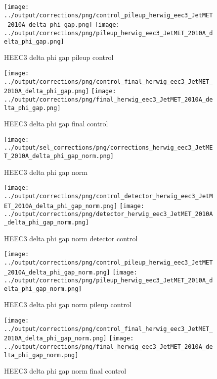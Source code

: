 \documentclass[11pt]{book}
\begin{document}
\begin{figure}[ht]
\centering
\texttt{[image: ../output/corrections/png/control\_pileup\_herwig\_eec3\_JetMET\_2010A\_delta\_phi\_gap.png]}
\texttt{[image: ../output/corrections/png/pileup\_herwig\_eec3\_JetMET\_2010A\_delta\_phi\_gap.png]}
\caption{HEEC3 delta phi gap pileup control}
\label{fig:HEEC3_JetMET_2010A_delta_phi_gap_pileup_control}
\end{figure}


\begin{figure}[ht]
\centering
\texttt{[image: ../output/corrections/png/control\_final\_herwig\_eec3\_JetMET\_2010A\_delta\_phi\_gap.png]}
\texttt{[image: ../output/corrections/png/final\_herwig\_eec3\_JetMET\_2010A\_delta\_phi\_gap.png]}
\caption{HEEC3 delta phi gap final control}
\label{fig:HEEC3_JetMET_2010A_delta_phi_gap_final_control}
\end{figure}


\begin{figure}[ht]
\centering
\texttt{[image: ../output/sel\_corrections/png/corrections\_herwig\_eec3\_JetMET\_2010A\_delta\_phi\_gap\_norm.png]}
\caption{HEEC3 delta phi gap norm}
\label{fig:HEEC3_JetMET_2010A_delta_phi_gap_norm}
\end{figure}

\begin{figure}[ht]
\centering
\texttt{[image: ../output/corrections/png/control\_detector\_herwig\_eec3\_JetMET\_2010A\_delta\_phi\_gap\_norm.png]}
\texttt{[image: ../output/corrections/png/detector\_herwig\_eec3\_JetMET\_2010A\_delta\_phi\_gap\_norm.png]}
\caption{HEEC3 delta phi gap norm detector control}
\label{fig:HEEC3_JetMET_2010A_delta_phi_gap_norm_detector_control}
\end{figure}

\begin{figure}[ht]
\centering
\texttt{[image: ../output/corrections/png/control\_pileup\_herwig\_eec3\_JetMET\_2010A\_delta\_phi\_gap\_norm.png]}
\texttt{[image: ../output/corrections/png/pileup\_herwig\_eec3\_JetMET\_2010A\_delta\_phi\_gap\_norm.png]}
\caption{HEEC3 delta phi gap norm pileup control}
\label{fig:HEEC3_JetMET_2010A_delta_phi_gap_norm_pileup_control}
\end{figure}


\begin{figure}[ht]
\centering
\texttt{[image: ../output/corrections/png/control\_final\_herwig\_eec3\_JetMET\_2010A\_delta\_phi\_gap\_norm.png]}
\texttt{[image: ../output/corrections/png/final\_herwig\_eec3\_JetMET\_2010A\_delta\_phi\_gap\_norm.png]}
\caption{HEEC3 delta phi gap norm final control}
\label{fig:HEEC3_JetMET_2010A_delta_phi_gap_norm_final_control}
\end{figure}
\end{document}
